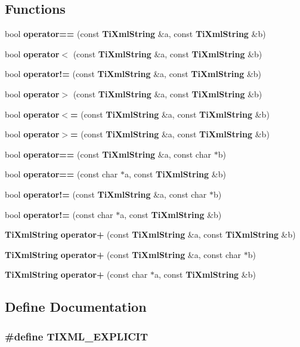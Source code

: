 \subsection*{Functions}
\begin{CompactItemize}
\item 
bool {\bf operator==} (const {\bf TiXmlString} \&a, const {\bf TiXmlString} \&b)
\item 
bool {\bf operator$<$} (const {\bf TiXmlString} \&a, const {\bf TiXmlString} \&b)
\item 
bool {\bf operator!=} (const {\bf TiXmlString} \&a, const {\bf TiXmlString} \&b)
\item 
bool {\bf operator$>$} (const {\bf TiXmlString} \&a, const {\bf TiXmlString} \&b)
\item 
bool {\bf operator$<$=} (const {\bf TiXmlString} \&a, const {\bf TiXmlString} \&b)
\item 
bool {\bf operator$>$=} (const {\bf TiXmlString} \&a, const {\bf TiXmlString} \&b)
\item 
bool {\bf operator==} (const {\bf TiXmlString} \&a, const char $\ast$b)
\item 
bool {\bf operator==} (const char $\ast$a, const {\bf TiXmlString} \&b)
\item 
bool {\bf operator!=} (const {\bf TiXmlString} \&a, const char $\ast$b)
\item 
bool {\bf operator!=} (const char $\ast$a, const {\bf TiXmlString} \&b)
\item 
{\bf TiXmlString} {\bf operator+} (const {\bf TiXmlString} \&a, const {\bf TiXmlString} \&b)
\item 
{\bf TiXmlString} {\bf operator+} (const {\bf TiXmlString} \&a, const char $\ast$b)
\item 
{\bf TiXmlString} {\bf operator+} (const char $\ast$a, const {\bf TiXmlString} \&b)
\end{CompactItemize}


\subsection{Define Documentation}
\subsubsection{\setlength{\rightskip}{0pt plus 5cm}\#define TIXML\_\-EXPLICIT}\label{tinystr_8h_e341476cd6b94ee32e3e93110a759581}




